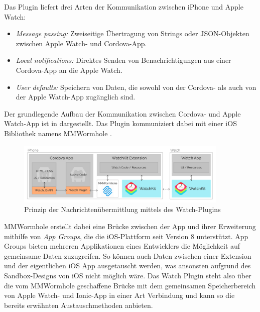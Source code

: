 Das Plugin liefert drei Arten der Kommunikation zwischen iPhone und Apple Watch:
\begin{itemize}
    \item \emph{Message passing:} Zweiseitige Übertragung von Strings oder JSON-Objekten zwischen Apple Watch- und Cordova-App.
    \item \emph{Local notifications:} Direktes Senden von Benachrichtigungen aus einer Cordova-App an die Apple Watch.
    \item \emph{User defaults:} Speichern von Daten, die sowohl von der Cordova- als auch von der Apple Watch-App zugänglich sind.
\end{itemize}
%
Der grundlegende Aufbau der Kommunikation zwischen Cordova- und Apple Watch-App ist in  dargestellt. Das Plugin kommuniziert dabei mit einer iOS Bibliothek namens MMWormhole \cite{gitMMWormhole}.
%
\begin{figure}[!htb] 
	\centering
	\includegraphics[width=0.9\textwidth]{data/bilder/apple-watch-plugin.png}
	\caption{Prinzip der Nachrichtenübermittlung mittels des Watch-Plugins \cite{CrossleyCordovaAppleWatchPlugin}}
	\label{fig:watchPlugin}
\end{figure}
%
MMWormhole erstellt dabei eine Brücke zwischen der App und ihrer Erweiterung mithilfe von \emph{App Groups}, die die iOS-Plattform seit Version 8 unterstützt. App Groups bieten mehreren Applikationen eines Entwicklers die Möglichkeit auf gemeinsame Daten zuzugreifen. So können auch Daten zwischen einer Extension und der eigentlichen iOS App ausgetauscht werden, was ansonsten aufgrund des Sandbox-Designs von iOS nicht möglich wäre. Das Watch Plugin steht also über die vom MMWormhole geschaffene Brücke mit dem gemeinsamen Speicherbereich von Apple Watch- und Ionic-App in einer Art Verbindung und kann so die bereits erwähnten Austauschmethoden anbieten.
%
%
